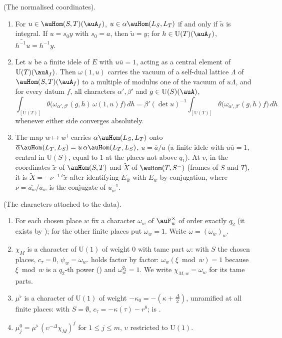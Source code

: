 \documentclass[10pt]{amsart}
\theoremstyle{definition}
\theoremstyle{remark}
\providecommand{\auU}{\mathrm U}
\providecommand{\aubar}[1]{\overline{#1}}
\newenvironment{quotedthm}[2]{\par\medskip\noindent\begingroup
  \textbf{#1}#2.\ \itshape\ignorespaces}{\endgroup\par\medskip}
\newenvironment{quoteddef}[2]{\par\medskip\noindent\begingroup
  \textbf{#1}#2.\ \ignorespaces}{\endgroup\par\medskip}
\begin{document}
\begin{quotedthm}{\cite[Lemma~6.32]{P53}}{ (The normalised coordinates)}
\begin{enumerate}
\item[(d)] For $u\in\auHom(S,T)(\auA_f)$, $u\in\alpha\auHom(L_S,L_T)$ if and only if $\tilde u$ is
integral. If $u=s_0y$ with $s_0=a$, then $\tilde u=y$; for $h\in\auU(T)(\auA_f)$,
$\widetilde{h^{-1}u}=h^{-1}y$.
\item[(e)] Let $u$ be a finite idele of $E$ with $u\aubar u=1$, acting as a central element of
$\auU(T)(\auA_f)$. Then $\omega(1,u)$ carries the vacuum of a self-dual lattice $\Lambda$ of
$\auHom(S,T)(\auA_f)$ to a multiple of modulus one of the vacuum of $u\Lambda$, and for every datum $f$,
all characters $\alpha',\beta'$ and $g\in\auU(S)(\auA)$,
\[
\int_{[\auU(T)]}\theta\bigl(\omega_{\alpha',\beta'}(g,h)\,\omega(1,u)f\bigr)\,dh=\beta'(\det u)^{-1}
\int_{[\auU(T)]}\theta\bigl(\omega_{\alpha',\beta'}(g,h)f\bigr)\,dh
\]
whenever either side converges absolutely.
\item[(f)] The map $w\mapsto w^\dagger$ carries $\alpha\auHom(L_S,L_T)$ onto $\aubar\alpha\auHom(L_T,L_S)=
u\,\alpha\auHom(L_T,L_S)$, $u=\aubar a/a$ (a finite idele with $u\aubar u=1$, central in $\auU(S)$,
equal to $1$ at the places not above $q_1$). At $v$, in the coordinates $\tilde x$ of $\auHom(S,T)$ and
$\tilde X$ of $\auHom(T,S^-)$ (frames of $S$ and $T$), it is $\tilde X=-\nu^{-1}\,{}^t\tilde x$ after
identifying $E_{\aubar w}$ with $E_w$ by conjugation, where $\nu=\aubar{a_{\aubar w}}/a_w$ is the
conjugate of $u_{\aubar w}^{-1}$.
\end{enumerate}
\end{quotedthm}

\begin{quoteddef}{\cite[Definition~6.14]{P54}}{ (The characters attached to the data)}
\begin{enumerate}
\item[(i)] For each chosen place $w$ fix a character $\omega_w$ of $\auF_w^\times$ of order exactly $q_2$ (it exists by
{\cite[Lemma~6.12(d)]{P54}}); for the other finite places put $\omega_w=1$. Write $\omega=(\omega_w)_w$.
\item[(ii)] $\chi_M$ is a character of $\auU(1)$ of weight $0$ with tame part $\omega$: {\cite[Lemma~6.13]{P54}} with $S$ the chosen places,
$c_\tau=0$, $\psi_w=\omega_w$. {\cite[(39)]{P54}} holds factor by factor: $\omega_w(\xi\bmod w)=1$ because $\xi\bmod w$ is a
$q_2$-th power ({\cite[Lemma~6.12(d)]{P54}}) and $\omega_w^{q_2}=1$. We write $\chi_{M,w}=\omega_w$ for its tame parts.
\item[(iii)] $\mu^\flat$ is a character of $\auU(1)$ of weight $-\kappa_0=-(\kappa+\frac\Delta2)$, unramified at all finite places:
{\cite[Lemma~6.13]{P54}} with $S=\emptyset$, $c_\tau=-\kappa(\tau)-r^8$; {\cite[(39)]{P54}} is {\cite[Lemma~6.12(c)]{P54}}.
\item[(iv)] $\mu^0_j=\mu^\flat\,(\upsilon^{-\Delta}\chi_M)^j$ for $1\le j\le m$, $\upsilon$ restricted to $\auU(1)$.
\end{enumerate}
\end{quoteddef}
\end{document}
